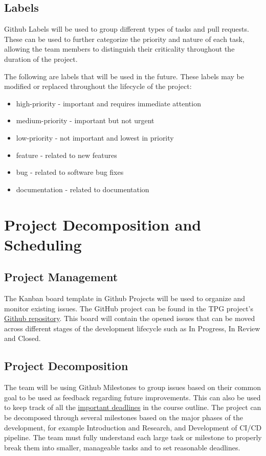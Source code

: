 \documentclass{article}
\begin{document}
\subsection{Labels}
Github Labels will be used to group different types of tasks and pull requests. These can be used to further categorize the priority and nature of each task, allowing the team members to distinguish their criticality throughout the duration of the project.

\vspace{10pt}

\noindent The following are labels that will be used in the future. These labels may be modified or replaced throughout the lifecycle of the project:

\begin{itemize}
  \item high-priority - important and requires immediate attention
  \item medium-priority - important but not urgent
  \item low-priority - not important and lowest in priority
  \item feature - related to new features
  \item bug - related to software bug fixes
  \item documentation - related to documentation
\end{itemize}

\section{Project Decomposition and Scheduling}

\subsection{Project Management}
The Kanban board template in Github Projects will be used to organize and monitor existing issues. The GitHub project can be found in the TPG project’s \href{https://github.com/orgs/TPGEngine/projects/1}{Github repository}. This board will contain the opened issues that can be moved across different stages of the development lifecycle such as In Progress, In Review and Closed. 

\subsection{Project Decomposition}
The team will be using Github Milestones to group issues based on their common goal to be used as feedback regarding future improvements. This can also be used to keep track of all the \href{https://github.com/TPGEngine/tpg/milestones}{important deadlines} in the course outline. The project can be decomposed through several milestones based on the major phases of the development, for example Introduction and Research, and Development of CI/CD pipeline. The team must fully understand each large task or milestone to properly break them into smaller, manageable tasks and to set reasonable deadlines. 
\end{document}
